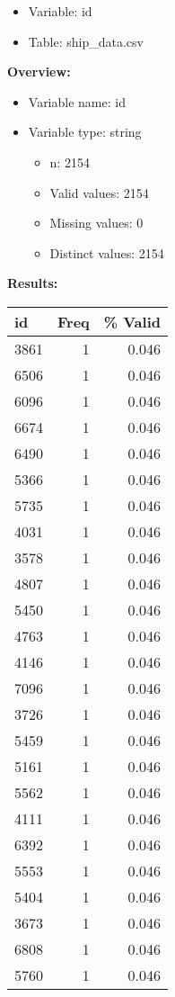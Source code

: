 \documentclass[
]{article}
\providecommand{\tightlist}{%
  \setlength{\itemsep}{0pt}\setlength{\parskip}{0pt}}
\begin{document}
\begin{itemize}
\tightlist
\item
  Variable: id
\item
  Table: ship\_data.csv
\end{itemize}

\textbf{Overview:}

\begin{itemize}
\tightlist
\item
  Variable name: id
\item
  Variable type: string

  \begin{itemize}
  \tightlist
  \item
    n: 2154
  \item
    Valid values: 2154
  \item
    Missing values: 0
  \item
    Distinct values: 2154
  \end{itemize}
\end{itemize}

\textbf{Results:}\\

\begin{table}[H]
\centering
\begin{tabular}{l|r|r}
\hline
\textbf{id} & \textbf{Freq} & \textbf{\% Valid}\\
\hline
3861 & 1 & 0.046\\
\hline
6506 & 1 & 0.046\\
\hline
6096 & 1 & 0.046\\
\hline
6674 & 1 & 0.046\\
\hline
6490 & 1 & 0.046\\
\hline
5366 & 1 & 0.046\\
\hline
5735 & 1 & 0.046\\
\hline
4031 & 1 & 0.046\\
\hline
3578 & 1 & 0.046\\
\hline
4807 & 1 & 0.046\\
\hline
5450 & 1 & 0.046\\
\hline
4763 & 1 & 0.046\\
\hline
4146 & 1 & 0.046\\
\hline
7096 & 1 & 0.046\\
\hline
3726 & 1 & 0.046\\
\hline
5459 & 1 & 0.046\\
\hline
5161 & 1 & 0.046\\
\hline
5562 & 1 & 0.046\\
\hline
4111 & 1 & 0.046\\
\hline
6392 & 1 & 0.046\\
\hline
5553 & 1 & 0.046\\
\hline
5404 & 1 & 0.046\\
\hline
3673 & 1 & 0.046\\
\hline
6808 & 1 & 0.046\\
\hline
5760 & 1 & 0.046\\
\hline
\end{tabular}
\end{table}
\end{document}
